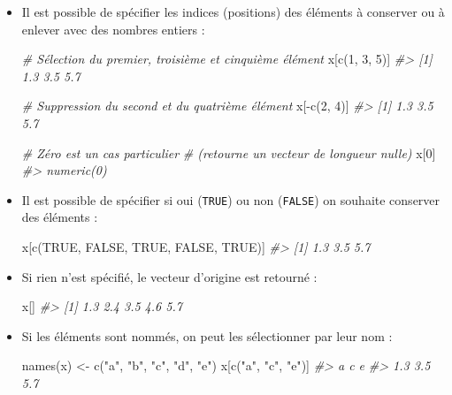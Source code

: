 \documentclass[
  french,
]{scrbook}
\newenvironment{Shaded}{\begin{snugshade}}{\end{snugshade}}
\newcommand{\CommentTok}[1]{\textcolor[rgb]{0.56,0.35,0.01}{\textit{#1}}}
\newcommand{\ConstantTok}[1]{\textcolor[rgb]{0.00,0.00,0.00}{#1}}
\newcommand{\DecValTok}[1]{\textcolor[rgb]{0.00,0.00,0.81}{#1}}
\newcommand{\FunctionTok}[1]{\textcolor[rgb]{0.00,0.00,0.00}{#1}}
\newcommand{\NormalTok}[1]{#1}
\newcommand{\OtherTok}[1]{\textcolor[rgb]{0.56,0.35,0.01}{#1}}
\newcommand{\SpecialCharTok}[1]{\textcolor[rgb]{0.00,0.00,0.00}{#1}}
\newcommand{\StringTok}[1]{\textcolor[rgb]{0.31,0.60,0.02}{#1}}
\begin{document}
\begin{itemize}
\item
  Il est possible de spécifier les indices (positions) des éléments à conserver ou à enlever avec des nombres entiers :

\begin{Shaded}
\begin{Highlighting}[]
\CommentTok{\# Sélection du premier, troisième et cinquième élément}
\NormalTok{x[}\FunctionTok{c}\NormalTok{(}\DecValTok{1}\NormalTok{, }\DecValTok{3}\NormalTok{, }\DecValTok{5}\NormalTok{)]}
\CommentTok{\#\textgreater{} [1] 1.3 3.5 5.7}

\CommentTok{\# Suppression du second et du quatrième élément}
\NormalTok{x[}\SpecialCharTok{{-}}\FunctionTok{c}\NormalTok{(}\DecValTok{2}\NormalTok{, }\DecValTok{4}\NormalTok{)]}
\CommentTok{\#\textgreater{} [1] 1.3 3.5 5.7}

\CommentTok{\# Zéro est un cas particulier}
\CommentTok{\# (retourne un vecteur de longueur nulle)}
\NormalTok{x[}\DecValTok{0}\NormalTok{]}
\CommentTok{\#\textgreater{} numeric(0)}
\end{Highlighting}
\end{Shaded}
\item
  Il est possible de spécifier si oui (\texttt{TRUE}) ou non (\texttt{FALSE}) on souhaite conserver des éléments :

\begin{Shaded}
\begin{Highlighting}[]
\NormalTok{x[}\FunctionTok{c}\NormalTok{(}\ConstantTok{TRUE}\NormalTok{, }\ConstantTok{FALSE}\NormalTok{, }\ConstantTok{TRUE}\NormalTok{, }\ConstantTok{FALSE}\NormalTok{, }\ConstantTok{TRUE}\NormalTok{)]}
\CommentTok{\#\textgreater{} [1] 1.3 3.5 5.7}
\end{Highlighting}
\end{Shaded}
\item
  Si rien n'est spécifié, le vecteur d'origine est retourné :

\begin{Shaded}
\begin{Highlighting}[]
\NormalTok{x[]}
\CommentTok{\#\textgreater{} [1] 1.3 2.4 3.5 4.6 5.7}
\end{Highlighting}
\end{Shaded}
\item
  Si les éléments sont nommés, on peut les sélectionner par leur nom :

\begin{Shaded}
\begin{Highlighting}[]
\FunctionTok{names}\NormalTok{(x) }\OtherTok{\textless{}{-}} \FunctionTok{c}\NormalTok{(}\StringTok{"a"}\NormalTok{, }\StringTok{"b"}\NormalTok{, }\StringTok{"c"}\NormalTok{, }\StringTok{"d"}\NormalTok{, }\StringTok{"e"}\NormalTok{)}
\NormalTok{x[}\FunctionTok{c}\NormalTok{(}\StringTok{"a"}\NormalTok{, }\StringTok{"c"}\NormalTok{, }\StringTok{"e"}\NormalTok{)]}
\CommentTok{\#\textgreater{}   a   c   e }
\CommentTok{\#\textgreater{} 1.3 3.5 5.7}
\end{Highlighting}
\end{Shaded}
\end{itemize}
\end{document}
